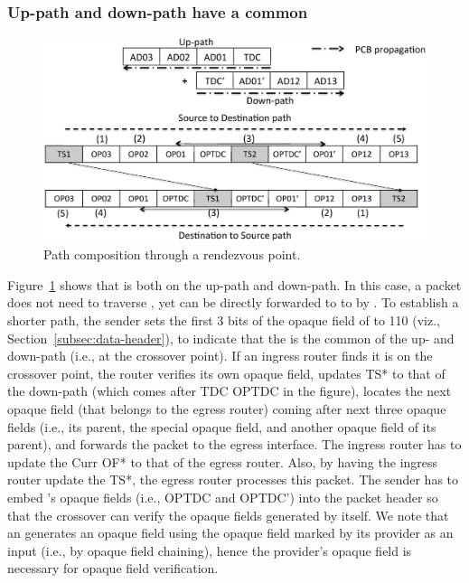 \subsubsection{Up-path and down-path have a common \AD}

\begin{figure}[h]
\centering
\includegraphics[width=.9\columnwidth]{./fig/nex_fwd2.eps}
\caption{Path composition through a rendezvous point.}\label{fig:ex-fwd-crossover}
\end{figure}

\noindent Figure~\ref{fig:ex-fwd-crossover} shows that  is both on the up-path and down-path. In this case, a packet does not need to traverse \TDC \AD, yet can be directly forwarded to to  by . To establish a shorter path, the sender sets the first 3 bits of the opaque field of  to 110 (viz., Section~\ref{subsec:data-header}), to indicate that the  is the common \AD of the up- and down-path (i.e., at the crossover point). If an ingress router finds it is on the crossover point, the router verifies its own opaque field, updates TS* to that of the down-path (which comes after TDC OPTDC in the figure), locates the next opaque field (that belongs to the egress router) coming after next three opaque fields (i.e., its parent, the special opaque field, and another opaque field of its parent), and forwards the packet to the egress interface. The ingress router has to update the Curr OF* to that of the egress router. Also, by having the ingress router update the TS*, the egress router processes this packet. The sender has to embed \TDC's opaque fields (i.e., OPTDC and OPTDC') into the packet header so that the crossover \AD can verify the opaque fields generated by itself. We note that an \AD generates an opaque field using the opaque field marked by its provider as an input (i.e., by opaque field chaining), hence the provider's opaque field is necessary for opaque field verification.  


